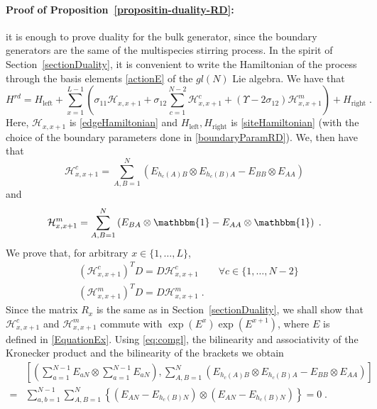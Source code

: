 \documentclass[10pt]{article}
\numberwithin{equation}{section}
\numberwithin{equation}{subsection}
\newcommand{\dt}{\;.}
\begin{document}
{\paragraph{Proof of Proposition~\ref{propositin-duality-RD}:}
it is enough to prove duality for the bulk generator, since the boundary generators are the same of the multispecies stirring process. In the spirit of Section~\ref{sectionDuality}, it is convenient to write the Hamiltonian of the process through the basis elements \eqref{actionE} of the ${gl}(N)$ Lie algebra. We have that
\begin{equation}
	H^{rd}=H_{\text{left}}+\sum_{x=1}^{L-1}\left(\sigma_{11}\mathcal{H}_{x,x+1}+\sigma_{12}\sum_{c=1}^{N-2}\mathcal{H}_{x,x+1}^{c}+(\Upsilon-2\sigma_{12})\mathcal{H}_{x,x+1}^{m}\right)+H_{\text{right}}\dt
\end{equation}
Here, $\mathcal{H}_{x,x+1}$ is  \eqref{edgeHamiltonian}  and $H_{\text{left}},H_{\text{right}}$ is \eqref{siteHamiltonian} (with the choice of the boundary parameters done in \eqref{boundaryParamRD}). We, then have that 
\begin{equation}
	\mathcal{H}_{x,x+1}^{c}=\sum_{A,B=1}^{N}\left(E_{h_{c}(A)B}\otimes E_{h_{c}(B)A}-E_{BB}\otimes E_{AA}\right)
\end{equation}
and 
\begin{equation}
	\mathcal{H}_{x,x+1}^{m}=\sum_{A,B=1}^{N}\left(E_{BA}\otimes \mathbbm{1}-E_{AA}\otimes \mathbbm{1}\right)\dt
\end{equation}
We prove that, for arbitrary $x\in\{1,\ldots,L\}$,
\begin{align}
	&(\mathcal{H}_{x,x+1}^{c})^{T}D=D\mathcal{H}_{x,x+1}^{c}\qquad \forall c\in \{1,\ldots,N-2\}\label{cDualityRelation}\\
	&(\mathcal{H}_{x,x+1}^{m})^{T}D=D\mathcal{H}_{x,x+1}^{m}\label{mDualityRelation}\dt
\end{align}
Since the matrix $R_{x}$ is the same as in Section~\ref{sectionDuality}, we shall show that $\mathcal{H}_{x,x+1}^{c}$ and $\mathcal{H}_{x,x+1}^{m}$ commute with $\exp{(E^{x})}\exp{(E^{x+1})}$, where $E$ is defined in \eqref{EquationEx}. Using \eqref{eq:comgl}, the bilinearity and associativity of the Kronecker product and the bilinearity of the brackets we obtain 
\begin{align*}
	&\left[\left(\sum_{a=1}^{N-1}E_{aN}\otimes\sum_{a=1}^{N-1}E_{aN}\right), \sum_{A,B=1}^{N}\left(E_{h_{c}(A)B}\otimes E_{h_{c}(B)A} -E_{BB}\otimes E_{AA}\right)\right]
	\\=&
	\sum_{a,b=1}^{N-1}\sum_{A,B=1}^{N}\left\{\left(E_{AN}-E_{h_{c}(B)N}\right)\otimes \left(E_{AN}-E_{h_{c}(B)N}\right)\right\}=0\dt

\end{align*}}
\end{document}
